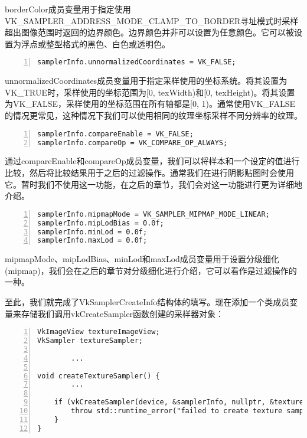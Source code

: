 \documentclass{ctexart}
\begin{document}
borderColor成员变量用于指定使用VK\_SAMPLER\_ADDRESS\_MODE\_CLAMP\_TO\_BORDER寻址模式时采样超出图像范围时返回的边界颜色。边界颜色并非可以设置为任意颜色。它可以被设置为浮点或整型格式的黑色、白色或透明色。

\begin{lstlisting}[language={[ANSI]C},keywordstyle=\color{blue!70},commentstyle=\color{red!50!green!50!blue!50},frame=shadowbox, rulesepcolor=\color{red!20!green!20!blue!20},basicstyle=\small,numbers=left, numberstyle=\tiny,breaklines=true]
samplerInfo.unnormalizedCoordinates = VK_FALSE;
\end{lstlisting}

unnormalizedCoordinates成员变量用于指定采样使用的坐标系统。将其设置为VK\_TRUE时，采样使用的坐标范围为[0, texWidth)和[0, texHeight)。将其设置为VK\_FALSE，采样使用的坐标范围在所有轴都是[0, 1)。通常使用VK\_FALSE的情况更常见，这种情况下我们可以使用相同的纹理坐标采样不同分辨率的纹理。

\begin{lstlisting}[language={[ANSI]C},keywordstyle=\color{blue!70},commentstyle=\color{red!50!green!50!blue!50},frame=shadowbox, rulesepcolor=\color{red!20!green!20!blue!20},basicstyle=\small,numbers=left, numberstyle=\tiny,breaklines=true]
samplerInfo.compareEnable = VK_FALSE;
samplerInfo.compareOp = VK_COMPARE_OP_ALWAYS;
\end{lstlisting}

通过compareEnable和compareOp成员变量，我们可以将样本和一个设定的值进行比较，然后将比较结果用于之后的过滤操作。通常我们在进行阴影贴图时会使用它。暂时我们不使用这一功能，在之后的章节，我们会对这一功能进行更为详细地介绍。

\begin{lstlisting}[language={[ANSI]C},keywordstyle=\color{blue!70},commentstyle=\color{red!50!green!50!blue!50},frame=shadowbox, rulesepcolor=\color{red!20!green!20!blue!20},basicstyle=\small,numbers=left, numberstyle=\tiny,breaklines=true]
samplerInfo.mipmapMode = VK_SAMPLER_MIPMAP_MODE_LINEAR;
samplerInfo.mipLodBias = 0.0f;
samplerInfo.minLod = 0.0f;
samplerInfo.maxLod = 0.0f;
\end{lstlisting}

mipmapMode、mipLodBias、minLod和maxLod成员变量用于设置分级细化(mipmap)，我们会在之后的章节对分级细化进行介绍，它可以看作是过滤操作的一种。

至此，我们就完成了VkSamplerCreateInfo结构体的填写。现在添加一个类成员变量来存储我们调用vkCreateSampler函数创建的采样器对象：

\begin{lstlisting}[language={[ANSI]C},keywordstyle=\color{blue!70},commentstyle=\color{red!50!green!50!blue!50},frame=shadowbox, rulesepcolor=\color{red!20!green!20!blue!20},basicstyle=\small,numbers=left, numberstyle=\tiny,breaklines=true]
VkImageView textureImageView;
VkSampler textureSampler;

		...

void createTextureSampler() {
		...

	if (vkCreateSampler(device, &samplerInfo, nullptr, &textureSampler) != VK_SUCCESS) {
		throw std::runtime_error("failed to create texture sampler!");
	}
}
\end{lstlisting}
\end{document}

